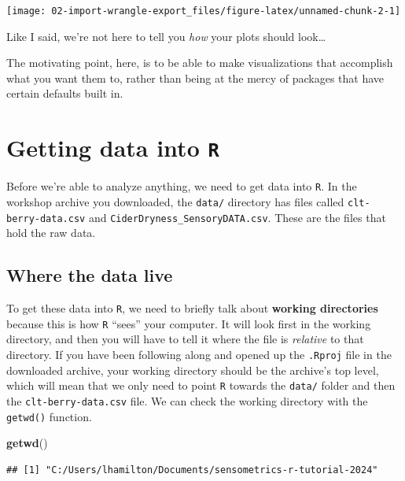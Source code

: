 \documentclass[
]{book}
\newenvironment{Shaded}{\begin{snugshade}}{\end{snugshade}}
\newcommand{\FunctionTok}[1]{\textcolor[rgb]{0.13,0.29,0.53}{\textbf{#1}}}
\newcommand{\NormalTok}[1]{#1}
\begin{document}
\begin{center}\texttt{[image: 02-import-wrangle-export\_files/figure-latex/unnamed-chunk-2-1]} \end{center}

Like I said, we're not here to tell you \emph{how} your plots should look\ldots{}

The motivating point, here, is to be able to make visualizations that accomplish what you want them to, rather than being at the mercy of packages that have certain defaults built in.

\hypertarget{getting-data-into-r}{%
\section{\texorpdfstring{Getting data into \texttt{R}}{Getting data into R}}\label{getting-data-into-r}}

Before we're able to analyze anything, we need to get data into \texttt{R}. In the workshop archive you downloaded, the \texttt{data/} directory has files called \texttt{clt-berry-data.csv} and \texttt{CiderDryness\_SensoryDATA.csv}. These are the files that hold the raw data.

\hypertarget{where-the-data-live}{%
\subsection{Where the data live}\label{where-the-data-live}}

To get these data into \texttt{R}, we need to briefly talk about \textbf{working directories} because this is how \texttt{R} ``sees'' your computer. It will look first in the working directory, and then you will have to tell it where the file is \emph{relative} to that directory. If you have been following along and opened up the \texttt{.Rproj} file in the downloaded archive, your working directory should be the archive's top level, which will mean that we only need to point \texttt{R} towards the \texttt{data/} folder and then the \texttt{clt-berry-data.csv} file. We can check the working directory with the \texttt{getwd()} function.

\begin{Shaded}
\begin{Highlighting}[]
\FunctionTok{getwd}\NormalTok{()}
\end{Highlighting}
\end{Shaded}

\begin{verbatim}
## [1] "C:/Users/lhamilton/Documents/sensometrics-r-tutorial-2024"
\end{verbatim}
\end{document}
